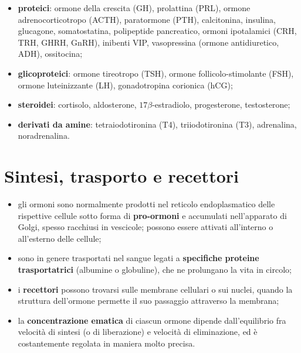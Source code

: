 \begin{itemize}
  \item \textbf{proteici}: ormone della crescita (GH), prolattina (PRL),
    ormone adrenocorticotropo (ACTH), paratormone (PTH), calcitonina,
    insulina, glucagone, somatostatina, polipeptide pancreatico, ormoni
    ipotalamici (CRH, TRH, GHRH, GnRH), inibenti VIP, vasopressina (ormone
    antidiuretico, ADH), ossitocina;
  \item \textbf{glicoproteici}: ormone tireotropo (TSH), ormone
    follicolo-stimolante (FSH), ormone luteinizzante (LH), gonadotropina
    corionica (hCG);
  \item \textbf{steroidei}: cortisolo, aldosterone, $17\beta$-estradiolo,
    progesterone, testosterone;
  \item \textbf{derivati da amine}: tetraiodotironina (T4), triiodotironina
    (T3), adrenalina, noradrenalina.
\end{itemize}

\section{Sintesi, trasporto e recettori}

\begin{itemize}
  \item gli ormoni sono normalmente prodotti nel reticolo endoplasmatico
    delle rispettive cellule sotto forma di \textbf{pro-ormoni} e accumulati
    nell'apparato di Golgi, spesso racchiusi in vescicole; possono essere
    attivati all'interno o all'esterno delle cellule;
  \item sono in genere trasportati nel sangue legati a \textbf{specifiche
    proteine trasportatrici} (albumine o globuline), che ne prolungano la
    vita in circolo;
  \item i \textbf{recettori} possono trovarsi sulle membrane cellulari o sui
    nuclei, quando la struttura dell'ormone permette il suo passaggio
    attraverso la membrana;
  \item la \textbf{concentrazione ematica} di ciascun ormone dipende
    dall'equilibrio fra velocità di sintesi (o di liberazione) e velocità di
    eliminazione, ed è costantemente regolata in maniera molto precisa.
\end{itemize}

